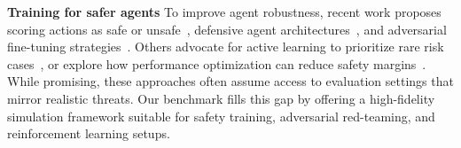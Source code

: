 \noindent \textbf{Training for safer agents} \quad
To improve agent robustness, recent work proposes scoring actions as safe or unsafe~\citep{yuan2024rjudgebenchmarkingsafetyrisk}, defensive agent architectures~\citep{chen2025shieldagentshieldingagentsverifiable}, and adversarial fine-tuning strategies~\citep{rosser2025agentbreedermitigatingaisafety}. Others advocate for active learning to prioritize rare risk cases~\citep{abdelnabi2025firewallssecuredynamicllm}, or explore how performance optimization can reduce safety margins~\citep{wu2025dissectingadversarialrobustnessmultimodal}. While promising, these approaches often assume access to evaluation settings that mirror realistic threats. Our benchmark fills this gap by offering a high-fidelity simulation framework suitable for safety training, adversarial red-teaming, and reinforcement learning setups.

